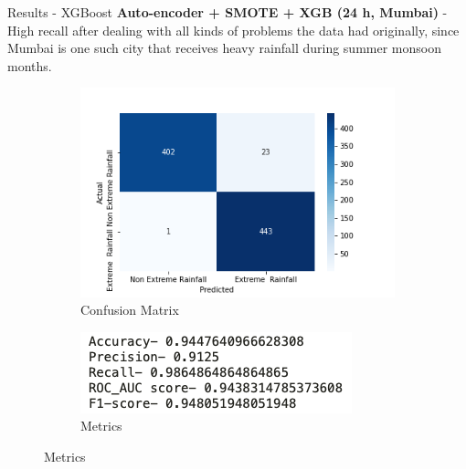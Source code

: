\documentclass[11pt]{beamer}
\begin{document}
\begin{frame}{Results - XGBoost}
\textbf{Auto-encoder + SMOTE + XGB (24 h, Mumbai)} - High recall after dealing with all kinds of problems the data had originally, since Mumbai is one such city that receives heavy rainfall during summer monsoon months.
\begin{figure}[!h]
\begin{subfigure}{.5\textwidth}
\centering
\includegraphics[width=\linewidth]{y_mumbai.png}
\caption{Confusion Matrix}
\end{subfigure}%
\begin{subfigure}{.5\textwidth}
\centering
\includegraphics[width=.8\linewidth]{res_mumbai.png}
\caption{Metrics}
\end{subfigure}
\end{figure}
\end{frame}
\end{document}
